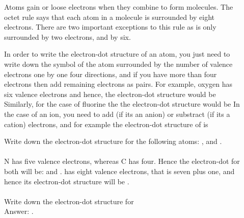 \documentclass[main.tex]{subfiles}
\begin{document}
\begin{description}
\item[] Atoms gain or loose electrons when they combine to form molecules. The octet rule says that each atom in a molecule is surrounded by eight electrons. There are two important exceptions to this rule as  is only surrounded by two electrons, and  by six.
\item[] In order to write the electron-dot structure of an atom, you just need to write down the symbol of the atom surrounded by the number of valence electrons one by one four directions, and if you have more than four electrons then add remaining electrons as pairs. For example, oxygen has six valence electrons and hence, the electron-dot structure would be \hspace{.05in}\hspace{.05in} Similarly, for the case of fluorine the  the electron-dot structure would be  \hspace{.05in} \hspace{.05in} In the case of an ion, you need to add (if its an anion) or substract (if its a cation) electrons, and for example the electron-dot structure of  is \hspace{.05in}\hspace{.05in}
\begin{example} %
Write down the electron-dot structure for the following atoms: ,  and .\\
\\
N has five valence electrons, whereas C has four. Hence the electron-dot for both will be: \hspace{.05in}\hspace{.05in} and  \hspace{.05in}\hspace{.05in}.  has eight valence electrons, that is seven plus one, and hence its electron-dot structure will be \hspace{.05in}\hspace{.05in}\ce{^{-}}. \\
\faDiamond\ \\
Write down the electron-dot structure for \\
\flushright Answer: \hspace{.05in}\hspace{.05in}.
\end{example}%



\end{description}
\end{document}
